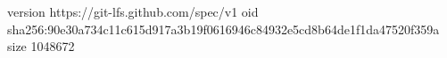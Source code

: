version https://git-lfs.github.com/spec/v1
oid sha256:90e30a734c11c615d917a3b19f0616946c84932e5cd8b64de1f1da47520f359a
size 1048672
